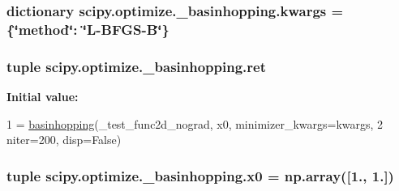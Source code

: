 \subsubsection[{kwargs}]{\setlength{\rightskip}{0pt plus 5cm}dictionary scipy.\+optimize.\+\_\+basinhopping.\+kwargs = \{\char`\"{}method\char`\"{}\+: \char`\"{}L-\/B\+F\+G\+S-\/B\char`\"{}\}}\label{namespacescipy_1_1optimize_1_1__basinhopping_af1073cfc3f47000d71431e4d4f033b21}
\hypertarget{namespacescipy_1_1optimize_1_1__basinhopping_aa266e39b61ee46db97b8c3949e6fff22}{}
\subsubsection[{ret}]{\setlength{\rightskip}{0pt plus 5cm}tuple scipy.\+optimize.\+\_\+basinhopping.\+ret}\label{namespacescipy_1_1optimize_1_1__basinhopping_aa266e39b61ee46db97b8c3949e6fff22}
{\bfseries Initial value\+:}
\begin{DoxyCode}
1 = \hyperlink{namespacescipy_1_1optimize_1_1__basinhopping_a33599dd3a1af47882707303ea89bb036}{basinhopping}(\_test\_func2d\_nograd, x0, minimizer\_kwargs=kwargs,
2                        niter=200, disp=\textcolor{keyword}{False})
\end{DoxyCode}
\hypertarget{namespacescipy_1_1optimize_1_1__basinhopping_adf49b15a9ea81879b1d8991926e3c150}{}
\subsubsection[{x0}]{\setlength{\rightskip}{0pt plus 5cm}tuple scipy.\+optimize.\+\_\+basinhopping.\+x0 = np.\+array(\mbox{[}1., 1.\mbox{]})}\label{namespacescipy_1_1optimize_1_1__basinhopping_adf49b15a9ea81879b1d8991926e3c150}
